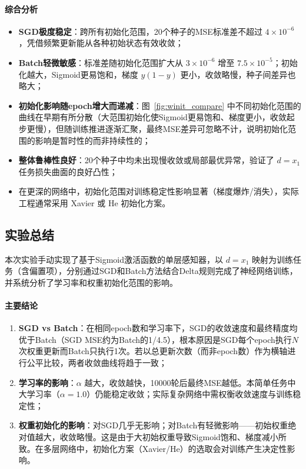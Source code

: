 \documentclass[10.5pt]{config}
\begin{document}
\paragraph{综合分析}

\begin{itemize}
    \item \textbf{SGD极度稳定}：跨所有初始化范围，20个种子的MSE标准差不超过 $4 \times 10^{-6}$，凭借频繁更新能从各种初始状态有效收敛；
    \item \textbf{Batch轻微敏感}：标准差随初始化范围扩大从 $3\times10^{-6}$ 增至 $7.5\times10^{-5}$；初始化越大，Sigmoid更易饱和，梯度 $y(1-y)$ 更小，收敛略慢，种子间差异也略大；
    \item \textbf{初始化影响随epoch增大而递减}：图~\ref{fig:winit_compare} 中不同初始化范围的曲线在早期有所分散（大范围初始化使Sigmoid更易饱和、梯度更小，收敛起步更慢），但随训练推进逐渐汇聚，最终MSE差异可忽略不计，说明初始化范围的影响是暂时性的而非持续性的；
    \item \textbf{整体鲁棒性良好}：20个种子中均未出现慢收敛或局部最优异常，验证了 $d=x_1$ 任务损失曲面的良好凸性；
    \item 在更深的网络中，初始化范围对训练稳定性影响显著（梯度爆炸/消失），实际工程通常采用 Xavier 或 He 初始化方案。
\end{itemize}

\subsection{实验总结}

本次实验手动实现了基于Sigmoid激活函数的单层感知器，以 $d=x_1$ 映射为训练任务（含偏置项），分别通过SGD和Batch方法结合Delta规则完成了神经网络训练，并系统分析了学习率和权重初始化范围的影响。

\paragraph{主要结论}

\begin{enumerate}
    \item \textbf{SGD vs Batch}：在相同epoch数和学习率下，SGD的收敛速度和最终精度均优于Batch（SGD MSE约为Batch的1/4.5），根本原因是SGD每个epoch执行$N$次权重更新而Batch只执行1次。若以总更新次数（而非epoch数）作为横轴进行公平比较，两者收敛曲线将趋于一致；
    \item \textbf{学习率的影响}：$\alpha$ 越大，收敛越快，10000轮后最终MSE越低。本简单任务中大学习率（$\alpha=1.0$）仍能稳定收敛；实际复杂网络中需权衡收敛速度与训练稳定性；
    \item \textbf{权重初始化的影响}：对SGD几乎无影响；对Batch有轻微影响——初始权重绝对值越大，收敛略慢。这是由于大初始权重导致Sigmoid饱和、梯度减小所致。在多层网络中，初始化方案（Xavier/He）的选取会对训练产生决定性影响。
\end{enumerate}
\end{document}
